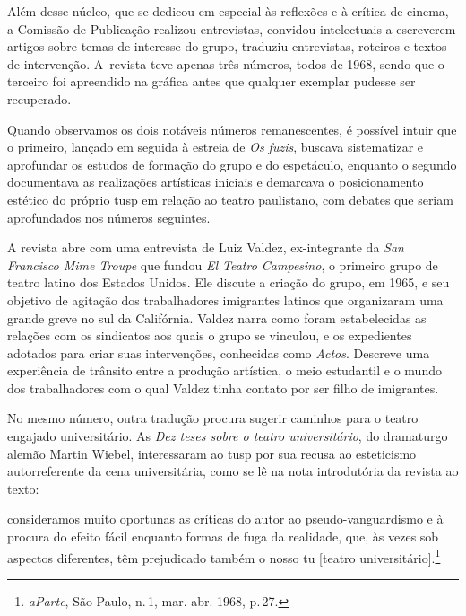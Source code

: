 Além desse núcleo, que se dedicou em especial às reflexões e à crítica
de cinema, a Comissão de Publicação realizou entrevistas, convidou
intelectuais a escreverem artigos sobre temas de interesse do grupo,
traduziu entrevistas, roteiros e textos de intervenção. A~revista teve
apenas três números, todos de 1968, sendo que o terceiro foi apreendido
na gráfica antes que qualquer exemplar pudesse ser recuperado.


Quando observamos os dois notáveis números remanescentes, é possível
intuir que o primeiro, lançado em seguida à estreia de {\it Os fuzis},
buscava sistematizar e aprofundar os estudos de formação do grupo e do
espetáculo, enquanto o segundo documentava as realizações
artísticas iniciais e demarcava o posicionamento estético do próprio {\sc tusp} em
relação ao teatro paulistano, com debates que seriam aprofundados nos
números seguintes.

A revista abre com uma entrevista de Luiz Valdez, ex-integrante da {\it San
Francisco Mime Troupe} que fundou {\it El Teatro Campesino}, o primeiro
grupo de teatro latino dos Estados Unidos. Ele discute a criação do
grupo, em 1965, e seu objetivo de agitação dos trabalhadores imigrantes
latinos que organizaram uma grande greve no sul da Califórnia. Valdez
narra como foram estabelecidas as relações com os sindicatos aos quais o
grupo se vinculou, e os expedientes adotados para criar suas
intervenções, conhecidas como {\it Actos}. Descreve uma experiência de
trânsito entre a produção artística, o meio estudantil e o mundo dos
trabalhadores com o qual Valdez tinha contato por ser filho de
imigrantes.

No mesmo número, outra tradução procura sugerir caminhos para o teatro
engajado universitário. As {\it Dez teses sobre o teatro universitário},
do dramaturgo alemão Martin Wiebel, interessaram ao {\sc tusp} por sua recusa
ao esteticismo autorreferente da cena universitária, como se lê na nota
introdutória da revista ao texto:

\startblockquote
consideramos muito oportunas as críticas do autor ao pseudo-vanguardismo
e à procura do efeito fácil enquanto formas de fuga da realidade, que,
às vezes sob aspectos diferentes, têm prejudicado também o nosso {\sc tu}
{[}teatro universitário{]}.\footnote{{\it aParte}, São Paulo, n.\,1,
  mar.-abr. 1968, p.\,27.}
\stopblockquote


